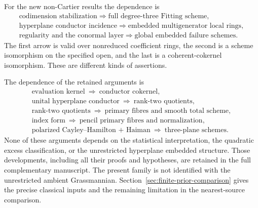 For the new non-Cartier results the dependence is
\[
 \begin{gathered}
 \text{codimension stabilization}
       \Longrightarrow\text{full degree-three Fitting scheme},\\
 \text{hyperplane conductor incidence}
       \Longrightarrow\text{embedded multigenerator local rings},\\
 \text{regularity and the conormal layer}
       \Longrightarrow\text{global embedded failure schemes}.
 \end{gathered}
\]
The first arrow is valid over nonreduced coefficient rings, the second
is a scheme isomorphism on the specified open, and the last is a
coherent-cokernel isomorphism. These are different kinds of assertions.

The dependence of the retained arguments is
\[
 \begin{gathered}
 \text{evaluation kernel}\ \Longrightarrow\ \text{conductor cokernel},\\
 \text{unital hyperplane conductor}\ \Longrightarrow\ \text{rank-two quotients},\\
 \text{rank-two quotients}\ \Longrightarrow\ \text{primary fibres and smooth total scheme},\\
 \text{index form}\ \Longrightarrow\ \text{pencil primary fibres and normalization},\\
 \text{polarized Cayley--Hamilton + Haiman}\ \Longrightarrow\ \text{three-plane schemes}.
 \end{gathered}
\]
None of these arguments depends on the statistical interpretation,
the quadratic excess classification, or the unrestricted hyperplane
embedded structure. Those developments, including all their proofs
and hypotheses, are retained in the full complementary manuscript.
The present family is not identified with the unrestricted ambient
Grassmannian. Section~\ref{sec:finite-prior-comparison} gives the
precise classical inputs and the remaining limitation in the
nearest-source comparison.
